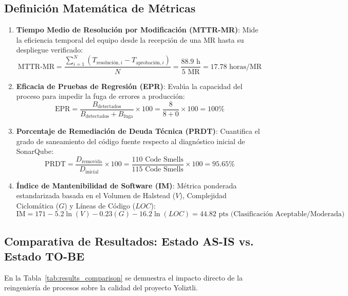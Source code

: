 \documentclass[12pt]{article}
\begin{document}
\subsection{Definición Matemática de Métricas}

\begin{enumerate}
    \item \textbf{Tiempo Medio de Resolución por Modificación (MTTR-MR)}:
    Mide la eficiencia temporal del equipo desde la recepción de una MR hasta su despliegue verificado:
    \begin{equation}
        \text{MTTR-MR} = \frac{\sum_{i=1}^{N} (T_{\text{resolución}, i} - T_{\text{aprobación}, i})}{N} = \frac{88.9\text{ h}}{5\text{ MR}} = 17.78\text{ horas/MR}
    \end{equation}

    \item \textbf{Eficacia de Pruebas de Regresión (EPR)}:
    Evalúa la capacidad del proceso para impedir la fuga de errores a producción:
    \begin{equation}
        \text{EPR} = \frac{B_{\text{detectados}}}{B_{\text{detectados}} + B_{\text{fuga}}} \times 100 = \frac{8}{8 + 0} \times 100 = 100\%
    \end{equation}

    \item \textbf{Porcentaje de Remediación de Deuda Técnica (PRDT)}:
    Cuantifica el grado de saneamiento del código fuente respecto al diagnóstico inicial de SonarQube:
    \begin{equation}
        \text{PRDT} = \frac{D_{\text{removida}}}{D_{\text{inicial}}} \times 100 = \frac{110\text{ Code Smells}}{115\text{ Code Smells}} \times 100 = 95.65\%
    \end{equation}

    \item \textbf{Índice de Mantenibilidad de Software (IM)}:
    Métrica ponderada estandarizada basada en el Volumen de Halstead ($V$), Complejidad Ciclomática ($G$) y Líneas de Código ($LOC$):
    \begin{equation}
        \text{IM} = 171 - 5.2 \ln(V) - 0.23(G) - 16.2 \ln(LOC) = 44.82\text{ pts (Clasificación Aceptable/Moderada)}
    \end{equation}
\end{enumerate}

\subsection{Comparativa de Resultados: Estado AS-IS vs. Estado TO-BE}
En la Tabla~\ref{tab:results_comparison} se demuestra el impacto directo de la reingeniería de procesos sobre la calidad del proyecto Yoliztli.
\end{document}
